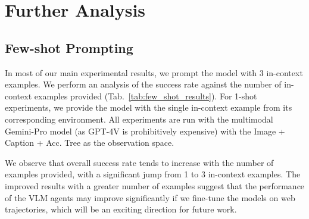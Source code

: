 \section{Further Analysis}  \label{sec:appendix_analysis}

\subsection{Few-shot Prompting}

\begin{table}[th]
\centering
\vspace{-0.1in}
\caption{Performance with different number of in-context examples.}
\label{tab:few_shot_results}
\end{table}

In most of our main experimental results, we prompt the model with 3 in-context examples. We perform an analysis of the success rate against the number of in-context examples provided (Tab.~\ref{tab:few_shot_results}). For 1-shot experiments, we provide the model with the single in-context example from its corresponding environment. All experiments are run with the multimodal Gemini-Pro model (as GPT-4V is prohibitively expensive) with the Image + Caption + Acc. Tree as the observation space.

We observe that overall success rate tends to increase with the number of examples provided, with a significant jump from 1 to 3 in-context examples. The improved results with a greater number of examples suggest that the performance of the VLM agents may improve significantly if we fine-tune the models on web trajectories, which will be an exciting direction for future work.

